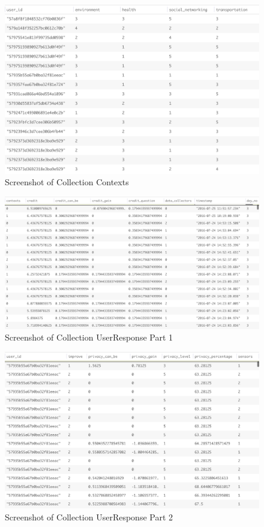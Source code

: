 \begin{figure}[ht!]
\centering
\includegraphics[width=\textwidth,keepaspectratio,height=0.6\textwidth]{./images/collection_context_cat}
\caption{Screenshot of Collection Contexts}
\label{fig:col_c}
\end{figure}

\begin{figure}[ht!]
\centering
\includegraphics[width=\textwidth,keepaspectratio, height=0.6\textwidth]{./images/collection_ur_1}
\caption{Screenshot of Collection UserResponse Part 1}
\label{fig:col_ur_1}
\end{figure}

\begin{figure}[ht!]
\centering
\includegraphics[width=\textwidth,keepaspectratio,height=0.6\textwidth]{./images/collection_ur_2}
\caption{Screenshot of Collection UserResponse Part 2}
\label{fig:col_ur_2}
\end{figure}

